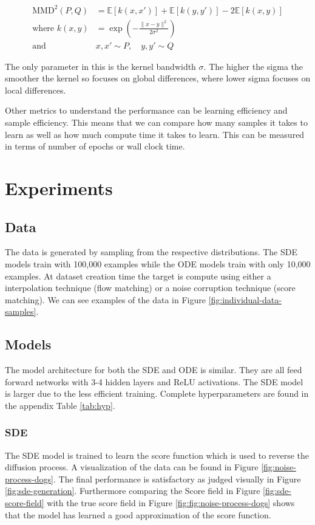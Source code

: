 \documentclass[conference,a4paper]{IEEEtran}
\begin{document}
\begin{align}
    \text{MMD}^2(P, Q) &= \mathbb{E}[k(x, x')] + \mathbb{E}[k(y, y')] - 2\mathbb{E}[k(x, y)]\\
    \text{where } k(x, y) &= \exp\left(-\frac{\|x - y\|^2}{2\sigma^2}\right)\\
    \text{and } &x, x' \sim P, \quad y, y' \sim Q 
\end{align}

The only parameter in this is the kernel bandwidth $\sigma$. The higher the sigma the smoother the kernel so focuses on global differences, where lower sigma focuses on local differences.

Other metrics to understand the performance can be learning efficiency and sample efficiency. This means that we can compare how many samples it takes to learn as well as how much compute time it takes to learn. This can be measured in terms of number of epochs or wall clock time.

\section{Experiments}

\subsection{Data}
The data is generated by sampling from the respective distributions. The SDE models train with 100,000 examples while the ODE models train with only 10,000 examples. At dataset creation time the target is compute using either a interpolation technique (flow matching) or a noise corruption technique (score matching). We can see examples of the data in Figure \ref{fig:individual-data-samples}.

\subsection{Models}
The model architecture for both the SDE and ODE is similar. They are all feed forward networks with 3-4 hidden layers and ReLU activations. The SDE model is larger due to the less efficient training. Complete hyperparameters are found in the appendix Table \ref{tab:hyp}.

\subsubsection{SDE}
The SDE model is trained to learn the score function which is used to reverse the diffusion process. A visualization of the data can be found in Figure \ref{fig:noise-process-dogs}. The final performance is satisfactory as judged visually in Figure \ref{fig:sde-generation}. Furthermore comparing the Score field in Figure \ref{fig:sde-score-field} with the true score field in Figure \ref{fig:fig:noise-process-dogs} shows that the model has learned a good approximation of the score function.
\end{document}
